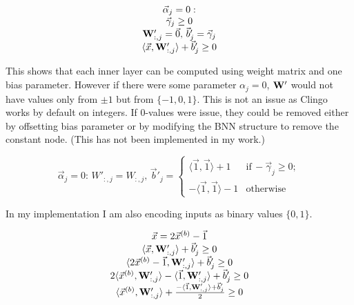 \documentclass{fithesis}
\begin{document}
\begin{equation*}
    \begin{matrix}
        \vec\alpha_j = 0: \\
        \vec\gamma_j \geq 0\\
        \mathbf{W}'_{:, j} = \vec 0, \,
        \vec b'_j = \vec\gamma_j\\
        \langle \vec x, \mathbf{W}'_{:, j}\rangle + \vec b'_j \geq 0\\
    \end{matrix}
\end{equation*}

This shows that each inner layer can be computed using weight matrix and
one bias parameter. However if there were some parameter $\alpha_j = 0$,
$\mathbf{W}'$ would not have values only from $\pm 1$ but from $\{-1, 0, 1\}$.
This is not an issue as Clingo works by default on integers.
If 0-values were issue, they could be removed either by offsetting bias
parameter or by modifying the BNN structure to remove the constant node.
(This has not been implemented in my work.)

\begin{equation*}
    \vec \alpha_j = 0:\, W'_{:,j} = W_{:,j},\, \vec b'_j = \left\{
        \begin{matrix}
            \langle\vec 1, \vec 1\rangle + 1 & \mathrm{if}\,-\vec\gamma_j \geq 0;\\
            -\langle\vec 1, \vec 1\rangle - 1 & \mathrm{otherwise}
        \end{matrix}
    \right.
\end{equation*}

In my implementation I am also encoding inputs as binary values $\{0, 1\}$.

\begin{equation*}
    \begin{matrix}
        \vec x = 2 \vec x^{(b)} - \vec1\\
        \langle \vec x, \mathbf{W}'_{:, j}\rangle + \vec b'_j \geq 0\\
        \langle 2\vec x^{(b)} - \vec1, \mathbf{W}'_{:, j}\rangle + \vec b'_j \geq 0\\
        2\langle \vec x^{(b)}, \mathbf{W}'_{:, j}\rangle - \langle\vec1, \mathbf{W}'_{:,j}\rangle + \vec b'_j \geq 0\\
        \langle \vec x^{(b)}, \mathbf{W}'_{:, j}\rangle + \frac{- \langle\vec1, \mathbf{W}'_{:,j}\rangle + \vec b'_j}{2} \geq 0\\
    \end{matrix}
\end{equation*}
\end{document}
